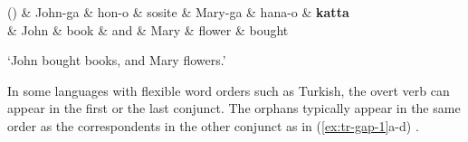 \documentclass[11pt]{article}
\newenvironment{myquote}%
  {\list{}{\leftmargin=0.0in\rightmargin=0.0in}\item[]}%
  {\endlist}
\newcounter{excounter}
\begin{document}
\begin{myquote}
  \label{ex:jp-gap-1}
  \footnotesize
  \begin{dependency}[edge unit distance=2.5ex]
    \begin{deptext}
     (\theexcounter) \& John-ga \& hon-o \& sosite  \& Mary-ga \& hana-o \& \textbf{katta} \\
     \& John  \& book \&  and \& Mary \& flower \& bought \\
    \end{deptext}
  \end{dependency}
  \trans `John bought books, and Mary flowers.' \hfill \cite{Kato2006}
\end{myquote}

In some languages with flexible word orders such as Turkish, the overt verb can appear 
in the first or the last conjunct. The orphans typically appear in the same order as the 
correspondents in the other conjunct as in (\ref{ex:tr-gap-1}a-d) \cite{Bozsahin2000}.
\end{document}
